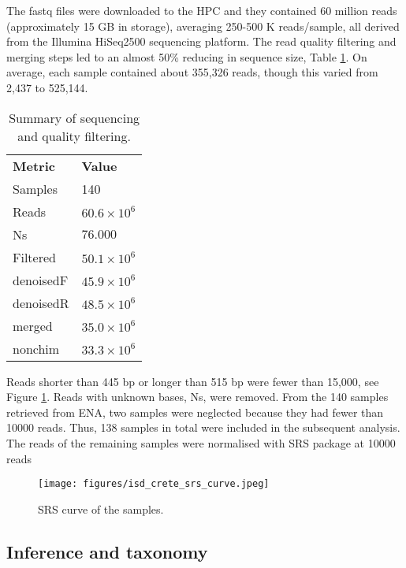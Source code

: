 The fastq files were downloaded to the HPC and they contained 60 million reads (approximately 15 GB in storage),
averaging 250-500 K reads/sample, all derived from the Illumina HiSeq2500 sequencing platform.
The read quality filtering and merging steps led to an almost 50\% reducing in sequence size, Table \ref{tab:metrics}. 
On average, each sample contained about 355,326 reads, though this varied from
2,437 to 525,144.

\begin{table}[h!]
\centering
\caption{Summary of sequencing and quality filtering.}
\begin{tabular}{@{}ll@{}}
\textbf{Metric} & \textbf{Value}     \\
Samples         & 140                \\
Reads           & $60.6 \times 10^6$ \\
Ns              & $76.000$           \\
Filtered        & $50.1 \times 10^6$ \\
denoisedF       & $45.9 \times 10^6$ \\
denoisedR       & $48.5 \times 10^6$ \\
merged          & $35.0 \times 10^6$ \\
nonchim         & $33.3 \times 10^6$ \\
\end{tabular}
\label{tab:metrics}
\end{table}

Reads shorter than 445 bp or longer than 515 bp were fewer than
15,000, see Figure \ref{fig:isd_srs-curve_samples}.
Reads with unknown bases, Ns, were removed.
From the 140 samples retrieved from ENA, two samples were 
neglected because they had fewer than 10000 reads.
Thus, 138 samples in total were included in the subsequent analysis.
The reads of the remaining samples were normalised with SRS package at 10000 reads \parencite{Beule2020}
   
   \begin{figure}[hbt!]
      \centering
      \texttt{[image: figures/isd\_crete\_srs\_curve.jpeg]}
      \caption[SRS curve]{SRS curve of the samples. }
      \label{fig:isd_srs-curve_samples}
   \end{figure}

\subsection{Inference and taxonomy}\label{inference_taxonomy}


